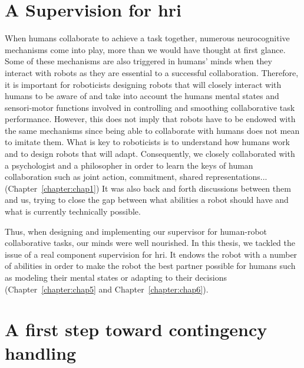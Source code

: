\documentclass[a4paper,11pt,twoside]{StyleThese}
\begin{document}
\section*{A Supervision for \acrlong{hri}}
When humans collaborate to achieve a task together, numerous neurocognitive mechanisms come into play, more than we would have thought at first glance. Some of these mechanisms are also triggered in humans’ minds when they interact with robots as they are essential to a successful collaboration. Therefore, it is important for roboticists designing robots that will closely interact with humans to be aware of and take into account the humans mental states and sensori-motor functions involved in controlling and smoothing collaborative task performance. However, this does not imply that robots have to be endowed with the same mechanisms since being able to collaborate with humans does not mean to imitate them. What is key to roboticists is to understand how humans work and to design  robots that will adapt. Consequently, we closely collaborated with a psychologist and a philosopher in order to learn the keys of human collaboration such as joint action, commitment, shared representations...(Chapter~\ref{chapter:chap1}) It was also back and forth discussions between them and us, trying to close the gap between what abilities a robot should have and what is currently technically possible.

Thus, when designing and implementing our supervisor for human-robot collaborative tasks, our minds were well nourished. In this thesis, we tackled the issue of a real component supervision for \acrshort{hri}. It endows the robot with a number of abilities in order to make the robot the best partner possible for humans such as modeling their mental states or adapting to their decisions (Chapter~\ref{chapter:chap5} and Chapter~\ref{chapter:chap6}).

\section*{A first step toward contingency handling}
\end{document}
